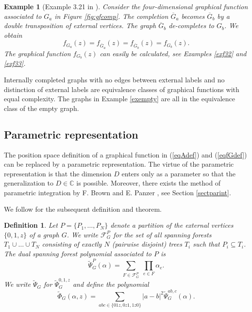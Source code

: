 \documentclass[oneside]{amsart}
\newcommand{\CC}{{\mathbb C}}
\newcommand{\Gg}{{\overline{G}}}
\newcommand{\sF}{\mathcal{F}}
\theoremstyle{plain}
\newtheorem{defn}[thm]{Definition}
\newtheorem{ex}[thm]{Example}
\begin{document}
\begin{ex}[Example 3.21 in \cite{gf}]\label{exf31}
Consider the four-dimensional graphical function associated to $G_a$ in Figure \ref{fig:gfcomp}. The completion $\Gg_a$ becomes $\Gg_b$ by a double transposition of external vertices.
The graph $\Gg_b$ de-completes to $G_b$. We obtain
$$
f_{G_a}(z)=f_{\Gg_a}(z)=f_{\Gg_b}(z)=f_{G_b}(z).
$$
The graphical function $f_{G_b}(z)$ can easily be calculated, see Examples \ref{exf32} and \ref{exf33}.
\end{ex}

Internally completed graphs with no edges between external labels and no distinction of external labels are equivalence classes of graphical functions with equal complexity.
The graphs in Example \ref{exempty} are all in the equivalence class of the empty graph.

\subsection{Parametric representation}\label{sectpar}
The position space definition of a graphical function in (\ref{eqAdef}) and (\ref{eqfGdef}) can be replaced by a parametric representation.
The virtue of the parametric representation is that the dimension $D$ enters only as a parameter so that the generalization to $D\in\CC$ is possible.
Moreover, there exists the method of parametric integration by F. Brown and E. Panzer \cite{BrH1,BrH2,Panzer:HyperInt}, see Section \ref{sectparint}.

We follow \cite{par} for the subsequent definition and theorem.

\begin{defn}\label{spanningforest}
Let $P=\{P_1,\ldots ,P_N\}$ denote a partition of the external vertices $\{0,1,z\}$ of a graph $G$.
We write $\sF_G^P$ for the set of all spanning forests $T_1\cup\ldots\cup T_N$ consisting of exactly $N$ (pairwise disjoint) trees $T_i$ such that $P_i \subseteq T_i$.
The \emph{dual spanning forest polynomial} associated to $P$ is
\begin{equation}\label{eq:dual-forpol}
\widetilde\Psi_G^P(\alpha)=\sum_{F\in\sF_G^P}\;\prod_{e\in F}\alpha_e.
\end{equation}
We write $\widetilde\Psi_G$ for $\widetilde\Psi_G^{0,1,z}$ and define the polynomial
\begin{equation}\label{eq:dual-phi}
\widetilde\Phi_G(\alpha,z)=\sum_{abc\in\{01z,0z1,1z0\}}|a-b|^2\widetilde\Psi_G^{ab,c}(\alpha).
\end{equation}
\end{defn}
\end{document}
